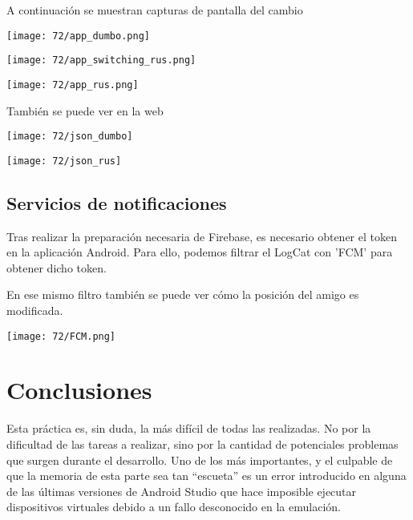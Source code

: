 A continuación se muestran capturas de pantalla del cambio

\begin{minipage}{\linewidth}
	\centering
	\texttt{[image: 72/app\_dumbo.png]}
	\label{fig:72/4}
\end{minipage}
\begin{minipage}{\linewidth}
	\centering
	\texttt{[image: 72/app\_switching\_rus.png]}
	\label{fig:72/5}
\end{minipage}
\begin{minipage}{\linewidth}
	\centering
	\texttt{[image: 72/app\_rus.png]}
	\label{fig:72/6}
\end{minipage}

También se puede ver en la web

\begin{minipage}{\linewidth}
	\centering
	\texttt{[image: 72/json\_dumbo]}
	\label{fig:72/7}
\end{minipage}
\begin{minipage}{\linewidth}
	\centering
	\texttt{[image: 72/json\_rus]}
	\label{fig:72/8}
\end{minipage}

\subsection{Servicios de notificaciones}

Tras realizar la preparación necesaria de Firebase, es necesario obtener el token en la aplicación Android.
Para ello, podemos filtrar el LogCat con 'FCM' para obtener dicho token.

En ese mismo filtro también se puede ver cómo la posición del amigo es modificada.

\begin{minipage}{\linewidth}
	\centering
	\texttt{[image: 72/FCM.png]}
	\label{fig:72/9}
\end{minipage}

\section{Conclusiones}
Esta práctica es, sin duda, la más difícil de todas las realizadas. No por la dificultad de las
tareas a realizar, sino por la cantidad de potenciales problemas que surgen durante el desarrollo.
Uno de los más importantes, y el culpable de que la memoria de esta parte sea tan ``escueta'' es
un error introducido en alguna de las últimas versiones de Android Studio que hace imposible
ejecutar dispositivos virtuales debido a un fallo desconocido en la emulación.

